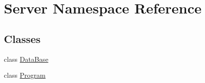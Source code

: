 \hypertarget{namespace_server}{}\section{Server Namespace Reference}
\label{namespace_server}
\subsection*{Classes}
\begin{DoxyCompactItemize}
\item 
class \mbox{\hyperlink{class_server_1_1_data_base}{Data\+Base}}
\item 
class \mbox{\hyperlink{class_server_1_1_program}{Program}}
\end{DoxyCompactItemize}
